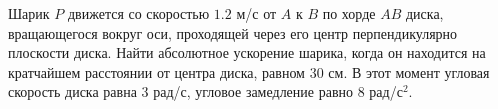 Шарик $P$ движется со скоростью $1.2$ м/с от $A$ к $B$ по хорде $AB$
диска, вращающегося вокруг оси, проходящей через его центр
перпендикулярно плоскости диска. Найти абсолютное ускорение шарика,
когда он находится на кратчайшем расстоянии от центра диска, равном
$30$ см. В этот момент угловая скорость диска равна $3$ рад/с, угловое
замедление равно $8$ рад/с$^2$.
